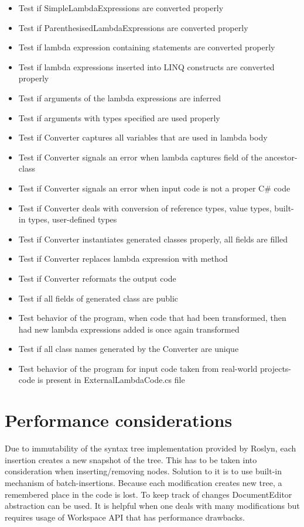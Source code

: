 \documentclass[]{report}
\begin{document}
     \begin{itemize}

         \item Test if SimpleLambdaExpressions are converted properly
         \item Test if ParenthesisedLambdaExpressions are converted properly
         \item Test if lambda expression containing statements are converted properly
         \item Test if lambda expressions inserted into LINQ constructs are converted properly
         \item Test if arguments of the lambda expressions are inferred
         \item Test if arguments with types specified are used properly
         \item Test if Converter captures all variables that are  used in lambda body
        \item Test if Converter signals an error when lambda captures field of the ancestor-class
        \item Test if Converter signals an error when input code is not a proper C\# code
        \item Test if Converter deals with conversion of reference types, value types, built-in types, user-defined  types
        \item Test if Converter instantiates generated classes properly, all fields are filled
        \item Test if Converter replaces lambda expression with method
        \item Test if Converter reformats the output code
        \item Test if all fields of generated class are public
        \item Test behavior of the program, when code that had been transformed, then had new lambda expressions added is once again transformed
        \item Test if all class names generated by the Converter are unique
        \item Test behavior of the program for input code taken from real-world projects-code is present in ExternalLambdaCode.cs file
        \end{itemize}
     

    
    
    
    \section{Performance considerations}
    Due to immutability of the syntax tree implementation provided by Roslyn, each insertion creates a new snapshot of the tree. This has to be taken into consideration when inserting/removing nodes. Solution to it is to use built-in mechanism of batch-insertions. Because each modification creates new tree, a remembered place in the code is lost. To keep track of changes DocumentEditor abstraction can be used. It is helpful when one deals with many modifications but requires usage of Workspace API that has performance drawbacks.
    
\end{document}
